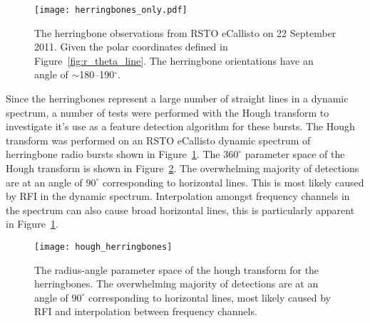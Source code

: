 \begin{figure}[t!]
\begin{center}
\texttt{[image: herringbones\_only.pdf]}
\caption[Herringbone observations]{The herringbone observations from RSTO eCallisto on 22 September 2011. Given the polar coordinates defined in Figure~\ref{fig:r_theta_line}. The herringbone orientations have an angle of $\sim$180--190$^{\circ}$.}
\label{fig:herringbones_only}
\end{center}
\end{figure}
Since the herringbones represent a large number of straight lines in a dynamic spectrum, a number of tests were performed with the Hough transform to investigate it's use as a feature detection algorithm for these bursts. The Hough transform was performed on an RSTO eCallisto dynamic spectrum of herringbone radio bursts shown in Figure~\ref{fig:herringbones_only}. The $360^{\circ}$ parameter space of the Hough transform is shown in Figure~\ref{fig:hough_space}. The overwhelming majority of detections are at an angle of $90^{\circ}$ corresponding to horizontal lines. This is most likely caused by RFI in the dynamic spectrum. Interpolation amongst frequency channels in the spectrum can also cause broad horizontal lines, this is particularly apparent in Figure~\ref{fig:herringbones_only}.
\begin{figure}[t!]
\begin{center}
\texttt{[image: hough\_herringbones]}
\caption[Hough transform]{The radius-angle parameter space of the hough transform for the herringbones. The overwhelming majority of detections are at an angle of $90^{\circ}$ corresponding to horizontal lines, most likely caused by RFI and interpolation between frequency channels.}
\label{fig:hough_space}
\end{center}
\end{figure}
%
%

